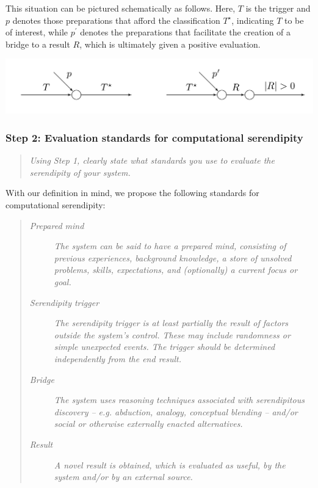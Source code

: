 This situation can be pictured schematically as follows.  Here, $T$ is
the trigger and $p$ denotes those preparations that afford the
classification $T^\star$, indicating $T$ to be of interest, while
$p^{\prime}$ denotes the preparations that facilitate the creation of a
bridge to a result $R$, which is ultimately given a positive
evaluation.

% 
{\centering
\includegraphics[width=.8\textwidth]{schematic}
\par}

\subsubsection*{ Step 2: Evaluation standards for computational serendipity}
\begin{quote} {\em Using Step 1, clearly state what standards you use to evaluate the serendipity of your
    system. }\end{quote}

With our definition in mind, we propose the following standards for
computational serendipity:

\begin{quote}
\begin{description}
\item[\emph{Prepared mind}] \emph{The system can be said to have a
  prepared mind, consisting of previous experiences, background
  knowledge, a store of unsolved problems, skills, expectations, and
  (optionally) a current focus or goal.}
\item[\emph{Serendipity trigger}] \emph{The serendipity trigger is at
  least partially the result of factors outside the system's control.
  These may include randomness or simple unexpected events.  The
  trigger should be determined independently from the end result.}
\item[\emph{Bridge}] \emph{The system uses reasoning techniques
  associated with serendipitous discovery -- e.g.  abduction, analogy,
  conceptual blending -- and/or social or otherwise externally enacted
  alternatives.}
\item[\emph{Result}] \emph{A novel result is obtained, which is
  evaluated as useful, by the system and/or by an external source.}
\end{description}
\end{quote}

